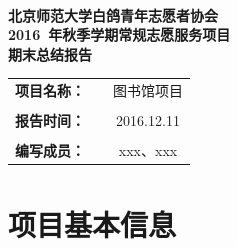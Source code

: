 \documentclass[nocover]{lizhechen}
\begin{document}
	
	\begin{center}
		\ 
		\\[20ex]
		{\heiti\huge \textbf{北京师范大学白鸽青年志愿者协会}}\\[3ex]
		{\heiti\huge \textbf{2016~年秋季学期常规志愿服务项目}}\\[3ex]
		{\heiti\huge \textbf{期末总结报告}}
		\\[70ex]
		\begin{table}[H]
			\begin{center}
				\begin{tabular}{ccc}
					{\Large \textbf{项目名称：}} & & {\Large 图书馆项目} \\
					 &  & \\
					{\Large \textbf{报告时间：}} & & {\Large 2016.12.11} \\
					 &  & \\
					{\Large \textbf{编写成员：}} & & {\Large xxx、xxx} \\
				\end{tabular}
			\end{center}
		\end{table}
	\end{center}
	
	\section{项目基本信息}
\end{document}
